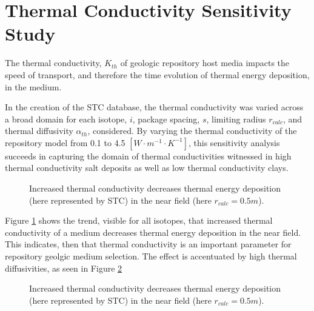 \section{Thermal Conductivity Sensitivity Study}\label{sec:conductivity}
The thermal conductivity, $K_{th}$ of geologic repository host media impacts 
the speed of transport, and therefore the time evolution of thermal energy 
deposition, in the medium. 

In the creation of the \gls{STC} database, the thermal conductivity was varied 
across a broad domain for each isotope, $i$, package spacing, $s$, limiting 
radius $r_{calc}$, and thermal diffusivity $\alpha_{th}$, considered.  By 
varying the thermal conductivity of the repository model from 0.1 to 4.5
$[W\cdot m^{-1} \cdot K^{-1}]$, this sensitivity analysis succeeds in capturing the domain of 
thermal conductivities witnessed in high thermal conductivity salt deposits as 
well as low thermal conductivity clays.

\begin{figure}[htbp!]
\begin{center}
\end{center}
\caption[$K_{th}$ Sensitivity for Low $\alpha_{th}$]{Increased thermal conductivity decreases thermal energy deposition 
(here represented by \gls{STC}) in the near field (here $r_{calc} = 0.5m$).}
\label{fig:Cm242Kth_alpha_low}
\end{figure}


Figure \ref{fig:Cm242Kth_alpha_low} shows the trend, visible for all isotopes, 
that increased thermal conductivity of a medium decreases thermal energy 
deposition in the near field. This indicates, then that thermal conductivity is 
an important parameter for repository geolgic medium selection. The effect is 
accentuated by high thermal diffusivities, as seen in 
Figure \ref{fig:Cm242Kth_alpha_high}

\begin{figure}[htbp!]
\begin{center}
\end{center}
\caption[$K_{th}$ Sensitivity for High $\alpha_{th}$]{Increased thermal conductivity decreases thermal energy deposition 
(here represented by \gls{STC}) in the near field (here $r_{calc} = 0.5m$).}
\label{fig:Cm242Kth_alpha_high}
\end{figure}


